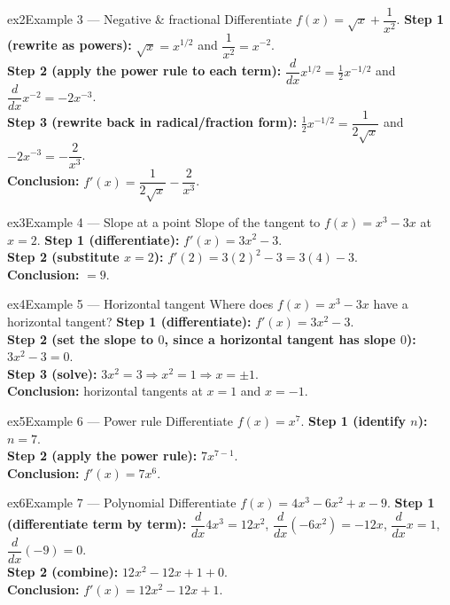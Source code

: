 \documentclass[11pt]{article}
\begin{document}
\begin{example}{ex2}{Example 3 --- Negative \& fractional}
Differentiate $f(x)=\sqrt{x}+\dfrac1{x^2}$.\soln
\textbf{Step 1 (rewrite as powers):} $\sqrt{x}=x^{1/2}$ and $\dfrac1{x^2}=x^{-2}$.\\[3pt]
\textbf{Step 2 (apply the power rule to each term):} $\dfrac{d}{dx}x^{1/2}=\tfrac12x^{-1/2}$ and $\dfrac{d}{dx}x^{-2}=-2x^{-3}$.\\[3pt]
\textbf{Step 3 (rewrite back in radical/fraction form):} $\tfrac12x^{-1/2}=\dfrac1{2\sqrt{x}}$ and $-2x^{-3}=-\dfrac2{x^3}$.\\[3pt]
\textbf{Conclusion:} $f'(x)=\dfrac1{2\sqrt{x}}-\dfrac2{x^3}$.
\end{example}

\begin{example}{ex3}{Example 4 --- Slope at a point}
Slope of the tangent to $f(x)=x^3-3x$ at $x=2$.\soln
\textbf{Step 1 (differentiate):} $f'(x)=3x^2-3$.\\[3pt]
\textbf{Step 2 (substitute $x=2$):} $f'(2)=3(2)^2-3=3(4)-3$.\\[3pt]
\textbf{Conclusion:} $=9$.
\end{example}

\begin{example}{ex4}{Example 5 --- Horizontal tangent}
Where does $f(x)=x^3-3x$ have a horizontal tangent?\soln
\textbf{Step 1 (differentiate):} $f'(x)=3x^2-3$.\\[3pt]
\textbf{Step 2 (set the slope to $0$, since a horizontal tangent has slope $0$):} $3x^2-3=0$.\\[3pt]
\textbf{Step 3 (solve):} $3x^2=3\Rightarrow x^2=1\Rightarrow x=\pm1$.\\[3pt]
\textbf{Conclusion:} horizontal tangents at $x=1$ and $x=-1$.
\end{example}

\begin{example}{ex5}{Example 6 --- Power rule}
Differentiate $f(x)=x^7$.\soln
\textbf{Step 1 (identify $n$):} $n=7$.\\[3pt]
\textbf{Step 2 (apply the power rule):} $7x^{7-1}$.\\[3pt]
\textbf{Conclusion:} $f'(x)=7x^6$.
\end{example}

\begin{example}{ex6}{Example 7 --- Polynomial}
Differentiate $f(x)=4x^3-6x^2+x-9$.\soln
\textbf{Step 1 (differentiate term by term):} $\dfrac{d}{dx}4x^3=12x^2$, $\dfrac{d}{dx}(-6x^2)=-12x$, $\dfrac{d}{dx}x=1$, $\dfrac{d}{dx}(-9)=0$.\\[3pt]
\textbf{Step 2 (combine):} $12x^2-12x+1+0$.\\[3pt]
\textbf{Conclusion:} $f'(x)=12x^2-12x+1$.
\end{example}
\end{document}
